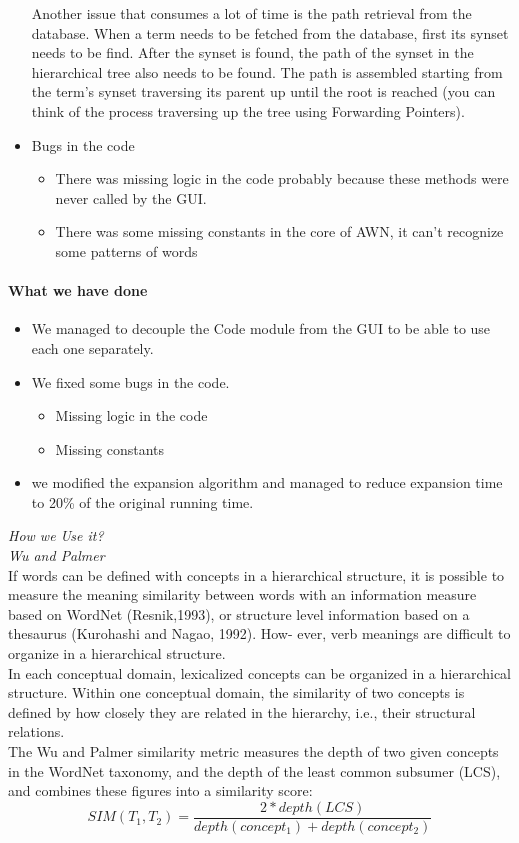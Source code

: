 \begin{itemize}
Another issue that consumes a lot of time is the path retrieval from the database. When a term needs to be fetched from the database, first its synset needs to be find. After the synset is found, the path of the synset in the hierarchical tree also needs to be found. The path is assembled starting from the term’s synset traversing its parent up until the root is reached (you can think of the process traversing up the tree using Forwarding Pointers). \\
\item Bugs in the code\\
\begin{itemize}
\item There was missing logic in the code probably because these methods were never called by the GUI.
\item There was some missing constants in the core of AWN, it can't recognize some patterns of words
\end{itemize}
\end{itemize}
  
\paragraph{What we have done}
\begin{itemize}
\item We managed to decouple the Code module from the GUI to be able to use each one separately.
\item We fixed some bugs in the code.
\begin{itemize}
\item Missing logic in the code
\item Missing constants
\end{itemize}
\item we modified the expansion algorithm and managed to reduce expansion time to 20\% of the original running time.
\end{itemize}

\textit{How we Use it?}\\
\textit{Wu and Palmer}\\
    If words can be defined with concepts in a hierarchical structure, it is possible to measure the meaning similarity between words with an information measure based on WordNet (Resnik,1993), or structure level information based on a thesaurus (Kurohashi and Nagao, 1992). How-
ever, verb meanings are difficult to organize in a hierarchical structure.\\
In each conceptual domain, lexicalized concepts can be organized in a hierarchical structure. Within one conceptual domain, the similarity of two concepts is defined by how closely they are related in the hierarchy, i.e., their structural relations.\\
The Wu and Palmer \citep{wu} similarity metric measures the depth of two given concepts in the WordNet taxonomy, and the depth of the least common subsumer (LCS), and combines these figures into a similarity score:
\begin{equation}
\label{wu_palmer}
SIM({T_{1}},{T_{2}}) =\frac{2 * depth(LCS)}{depth(concept_1)+ depth(concept_2)} 
\end{equation}

